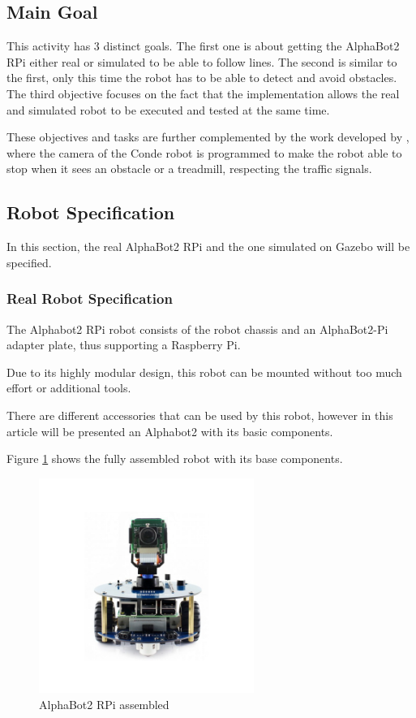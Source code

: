 \documentclass[conference]{IEEEtran}
\begin{document}
\subsection{Main Goal} \label{goal}

This activity has 3 distinct goals. The first one is about getting the AlphaBot2 RPi either real or simulated to be able to follow lines. The second is similar to the first, only this time the robot has to be able to detect and avoid obstacles. The third objective focuses on the fact that the implementation allows the real and simulated robot to be executed and tested at the same time.

These objectives and tasks are further complemented by the work developed by \cite{b1, b2, b3}, where the camera of the Conde robot is programmed to make the robot able to stop when it sees an obstacle or a treadmill, respecting the traffic signals.

\subsection{Robot Specification} \label{spec}

In this section, the real AlphaBot2 RPi and the one simulated on Gazebo  will be specified.

\subsubsection{Real Robot Specification} \label{spec_real}

The Alphabot2 RPi robot consists of the robot chassis and an AlphaBot2-Pi adapter plate, thus supporting a Raspberry Pi.

Due to its highly modular design, this robot can be mounted without too much effort or additional tools.

There are different accessories that can be used by this robot, however in this article will be presented an Alphabot2 with its basic components.

Figure \ref{fig:fig1} shows the fully assembled robot with its base components.

\begin{figure}[H]
    \centering
    \includegraphics[width=7cm]{Alphabot2-pi-3.png}
    \caption{AlphaBot2 RPi assembled}
    \label{fig:fig1}
\end{figure}
\end{document}
